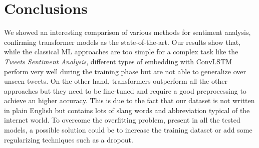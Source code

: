\documentclass{article}
\begin{document}
\section{Conclusions}
We showed an interesting comparison of various methods for sentiment analysis, confirming transformer models as the state-of-the-art. Our results show that, while the classical ML approaches are too simple for a complex task like the \textit{Tweets Sentiment Analysis}, different types of embedding with ConvLSTM perform very well during the training phase but are not able to generalize over unseen tweets.
On the other hand, transformers outperform all the other approaches but they need to be fine-tuned and require a good preprocessing to achieve an higher accuracy. This is due to the fact that our dataset is not written in plain English but contains lots of slang words and abbreviation typical of the internet world.
To overcome the overfitting problem, present in all the tested models, a possible solution could be to increase the training dataset or add some regularizing techniques such as a dropout.




\printbibliography
\end{document}
